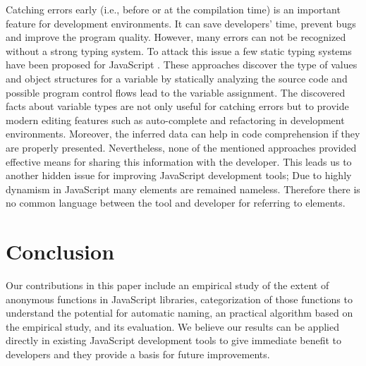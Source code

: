 \documentclass[10pt, preprint]{sigplanconf}
\begin{document}
Catching errors early (i.e., before or at the compilation time) is an important feature for development environments. It can save developers' time, prevent bugs and improve the program quality. However, many errors can not be recognized without a strong typing system. To attack this issue a few static typing systems have been proposed for JavaScript \cite{Anderson, Anderson2, Heidegger, Thiemann}. These approaches discover the type of values and object structures for a variable by statically analyzing the source code and possible program control flows lead to the variable assignment. The discovered facts about variable types are not only useful for catching errors but to provide modern editing features such as auto-complete and refactoring in development environments. Moreover, the inferred data can help in code comprehension if they are properly presented. Nevertheless, none of the mentioned approaches provided effective means for sharing this information with the developer. This leads us to another hidden issue for improving JavaScript development tools; Due to highly dynamism in JavaScript many elements are remained nameless. Therefore there is no common language between the tool and developer for referring to elements.


\section{Conclusion}
Our contributions in this paper include an empirical study of the extent of anonymous functions in JavaScript libraries, categorization of those functions to understand the potential for automatic naming, an practical algorithm based on the empirical study, and its evaluation.   We believe our results can be applied directly in existing JavaScript development tools to give immediate benefit to developers and they provide a basis for future improvements.
\end{document}
